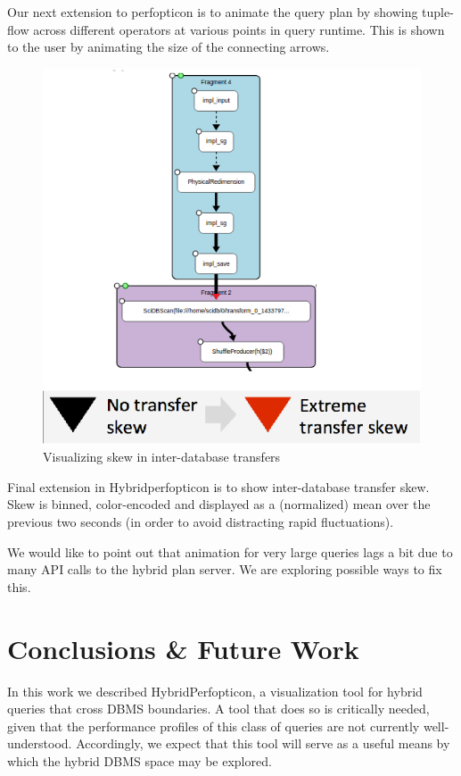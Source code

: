 \documentclass{chi2009}
\begin{document}
Our next extension to perfopticon is to animate the query plan by showing tuple-flow across different operators at various points in query runtime. This is shown to the user by animating the size of the connecting arrows. 

\begin{figure}[h]
\begin{center}
\includegraphics[scale=0.5]{skew.png}
\end{center}
\caption{Visualizing skew in inter-database transfers}
\label{fig:skew}
\end{figure}
Final extension in Hybridperfopticon is to show inter-database transfer skew. Skew is binned, color-encoded and displayed as a (normalized) mean over the previous two seconds (in order to avoid distracting rapid fluctuations). 

We would like to point out that animation for very large queries lags a bit due to many API calls to the hybrid plan server. We are exploring possible ways to fix this. 

\section{Conclusions \& Future Work}

In this work we described HybridPerfopticon, a visualization tool for hybrid queries that cross DBMS boundaries.  A tool that does so is critically needed, given that the performance profiles of this class of queries are not currently well-understood.  Accordingly, we expect that this tool will serve as a useful means by which the hybrid DBMS space may be explored.
\end{document}
